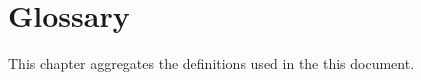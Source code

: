 
\chapter{Glossary}
\label{sec:glossary}

This chapter aggregates the definitions used in the this document.

\newcommand{\screenshot}[2]
{
  \begin{figure}[htp]
    \centering
    \texttt{[image: img/\#1]}
    \caption{#2}
    \label{fig:#1}
  \end{figure}
}

